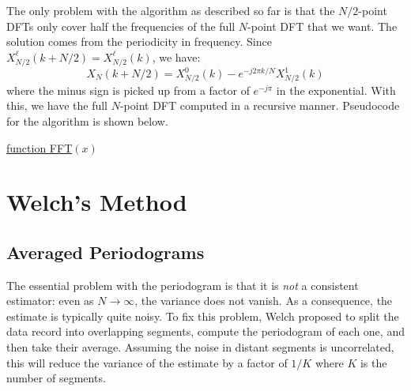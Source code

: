 \documentclass[twocolumn]{gwclass}
\newcommand{\C}{\mathbb{C}}
\begin{document}
The only problem with the algorithm as described so far is that the $N/2$-point DFTs only cover half the frequencies of the full $N$-point DFT that we want. The solution comes from the periodicity in frequency. Since $X^\ell_{N/2}(k+N/2)=X^\ell_{N/2}(k)$, we have:
$$ X_N(k+N/2) = X^0_{N/2}(k) - e^{-j2\pi k/N}X^1_{N/2}(k) $$
where the minus sign is picked up from a factor of $e^{-j\pi}$ in the exponential. With this, we have the full $N$-point DFT computed in a recursive manner. Pseudocode for the algorithm is shown below.

\begin{algorithm}
	\caption{Radix-2 FFT}
	
	\underline{function FFT}$(x)$\\
	\Input{Data $x\in \C^N$ for $N$ a power of $2$}
	\Output{DFT $X\in\C^N$}
	
\end{algorithm}



\section{Welch's Method}
\subsection{Averaged Periodograms}
The essential problem with the periodogram is that it is \emph{not} a consistent estimator: even as $N\to \infty$, the variance does not vanish. As a consequence, the estimate is typically quite noisy. To fix this problem, Welch proposed to split the data record into overlapping segments, compute the periodogram of each one, and then take their average. Assuming the noise in distant segments is uncorrelated, this will reduce the variance of the estimate by a factor of $1/K$ where $K$ is the number of segments. 
\end{document}
